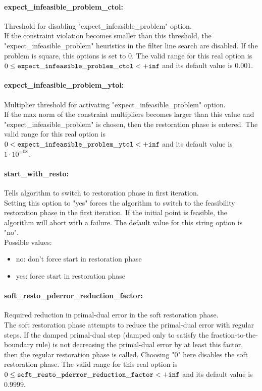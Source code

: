\paragraph{expect\_infeasible\_problem\_ctol:}\label{opt:expect_infeasible_problem_ctol} Threshold for disabling "expect\_infeasible\_problem" option. \\
 If the constraint violation becomes smaller than this threshold, the "expect\_infeasible\_problem" heuristics in the filter line search are disabled. If the problem is square, this options is set to 0. The valid range for this real option is 
$0 \le {\tt expect\_infeasible\_problem\_ctol } <  {\tt +inf}$
and its default value is $0.001$.


\paragraph{expect\_infeasible\_problem\_ytol:}\label{opt:expect_infeasible_problem_ytol} Multiplier threshold for activating "expect\_infeasible\_problem" option. \\
 If the max norm of the constraint multipliers becomes larger than this value and "expect\_infeasible\_problem" is chosen, then the restoration phase is entered. The valid range for this real option is 
$0 <  {\tt expect\_infeasible\_problem\_ytol } <  {\tt +inf}$
and its default value is $1 \cdot 10^{+08}$.


\paragraph{start\_with\_resto:}\label{opt:start_with_resto} Tells algorithm to switch to restoration phase in first iteration. \\
 Setting this option to "yes" forces the algorithm to switch to the feasibility restoration phase in the first iteration. If the initial point is feasible, the algorithm will abort with a failure. The default value for this string option is "no".
\\ 
Possible values:
\begin{itemize}
   \item no: don't force start in restoration phase
   \item yes: force start in restoration phase
\end{itemize}

\paragraph{soft\_resto\_pderror\_reduction\_factor:}\label{opt:soft_resto_pderror_reduction_factor} Required reduction in primal-dual error in the soft restoration phase. \\
 The soft restoration phase attempts to reduce the primal-dual error with regular steps. If the damped primal-dual step (damped only to satisfy the fraction-to-the-boundary rule) is not decreasing the primal-dual error by at least this factor, then the regular restoration phase is called. Choosing "0" here disables the soft restoration phase. The valid range for this real option is 
$0 \le {\tt soft\_resto\_pderror\_reduction\_factor } <  {\tt +inf}$
and its default value is $0.9999$.


